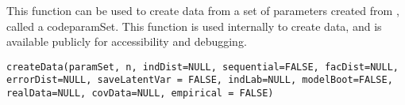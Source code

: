 \documentclass[a4paper]{book}
\begin{document}
%
\begin{Description}\relax
This function can be used to create data from a set of parameters created from , called a codeparamSet. This function is used internally to create data, and is available publicly for accessibility and debugging.
\end{Description}
%
\begin{Usage}
\begin{verbatim}
createData(paramSet, n, indDist=NULL, sequential=FALSE, facDist=NULL, 
errorDist=NULL, saveLatentVar = FALSE, indLab=NULL, modelBoot=FALSE, 
realData=NULL, covData=NULL, empirical = FALSE)
\end{verbatim}
\end{Usage}
%
\end{document}
